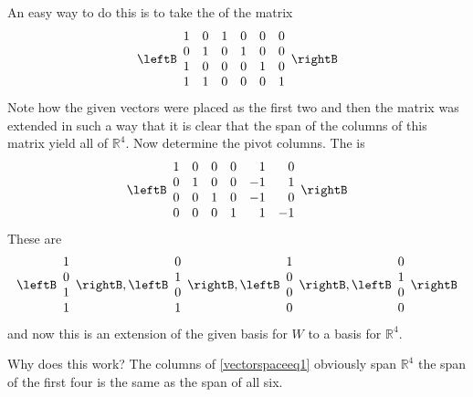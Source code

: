 \begin{solution}
An easy way to do this is to take the \rref\; of the matrix 
\begin{equation}
\leftB 
\begin{array}{cccccc}
1 & 0 & 1 & 0 & 0 & 0 \\ 
0 & 1 & 0 & 1 & 0 & 0 \\ 
1 & 0 & 0 & 0 & 1 & 0 \\ 
1 & 1 & 0 & 0 & 0 & 1
\end{array}
\rightB  \label{vectorspaceeq1}
\end{equation}
Note how the given vectors were placed as the first two and then the matrix
was extended in such a way that it is clear that the span of the columns of
this matrix yield all of $\mathbb{R}^{4}$. Now determine the pivot columns.
The \rref\; is 
\begin{equation}
\leftB 
\begin{array}{rrrrrr}
1 & 0 & 0 & 0 & 1 & 0 \\ 
0 & 1 & 0 & 0 & -1 & 1 \\ 
0 & 0 & 1 & 0 & -1 & 0 \\ 
0 & 0 & 0 & 1 & 1 & -1
\end{array}
\rightB  \label{vectorspaceeq2}
\end{equation}
These are 
\begin{equation*}
\leftB 
\begin{array}{c}
1 \\ 
0 \\ 
1 \\ 
1
\end{array}
\rightB ,\leftB 
\begin{array}{c}
0 \\ 
1 \\ 
0 \\ 
1
\end{array}
\rightB ,\leftB 
\begin{array}{c}
1 \\ 
0 \\ 
0 \\ 
0
\end{array}
\rightB ,\leftB 
\begin{array}{c}
0 \\ 
1 \\ 
0 \\ 
0
\end{array}
\rightB
\end{equation*}
and now this is an extension of the given basis for $W$ to a basis for $
\mathbb{R}^{4}$.

Why does this work? The columns of \ref{vectorspaceeq1} obviously span $\mathbb{R}
^{4}$  the span of the first four is the same as the span of all
six.
\end{solution}
